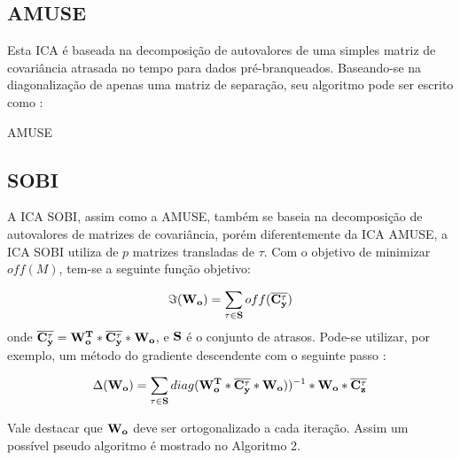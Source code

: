 \documentclass[a4paper,12pt]{monografia}
\theoremstyle{plain}
\theoremstyle{definition}
\theoremstyle{remark}
\begin{document}
\subsection{AMUSE}

Esta ICA é baseada na decomposição de autovalores de uma simples matriz de covariância atrasada no tempo para dados pré-branqueados. Baseando-se na diagonalização de apenas uma matriz de separação, seu algoritmo pode ser escrito como \cite{faier2011analise}:

 \begin{algorithm}[h]
   \SetAlgoLined
   \label{alg1}
   \caption{\textsc{AMUSE}}
 \end{algorithm}

\subsection{SOBI}

A ICA SOBI, assim como a AMUSE, também se baseia na decomposição de autovalores de matrizes de covariância, porém diferentemente da ICA AMUSE, a ICA SOBI utiliza de $p$ matrizes transladas de $\tau$. Com o objetivo de minimizar $off(M)$, tem-se a seguinte função objetivo:

\begin{equation}
   \Im ({\bf W_{o}})  =  \sum_{\tau \in {\bf S}}off(\overline{{\bf C_{y}^{\tau}}})
    \label{eq:sobi1}
\end{equation}
onde $\overline{{\bf C_{y}^{\tau}}}={\bf W_{o}^{T}*\overline{C_{y}^{\tau}}*W_{o}}$, e ${\bf S}$ é o conjunto de atrasos. Pode-se utilizar, por exemplo, um método do gradiente descendente com o seguinte passo \cite{hyvarinen2004independent}:

\begin{equation}
   \Delta ({\bf W_{o}})  =  \sum_{\tau \in {\bf S}}diag ({\bf W_{o}^{T}*\overline{C_{y}^{\tau}}*W_{o}}))^{-1}*{\bf W_{o}*\overline{C_{z}^{\tau}}}
    \label{eq:sobi2}
\end{equation}

Vale destacar que ${\bf W_{o}}$ deve ser ortogonalizado a cada iteração. Assim um possível pseudo algoritmo  é mostrado no Algoritmo 2.
\end{document}
